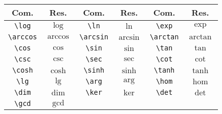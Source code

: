% 
% 
% 
% 
% 
\begin{tabular}{cc|cc|cc}
    \hline
    Com. & Res. & Com. & Res. & Com. & Res. \\ \hline
    \lstinline!\log! & $\log$ & \lstinline!\ln! & $\ln$ & \lstinline!\exp! & $\exp$ \\
    \lstinline!\arccos! & $\arccos$ & \lstinline!\arcsin! & $\arcsin$ & \lstinline!\arctan! & $\arctan$ \\
    \lstinline!\cos! & $\cos$ & \lstinline!\sin! & $\sin$ & \lstinline!\tan! & $\tan$ \\
    \lstinline!\csc! & $\csc$ & \lstinline!\sec! & $\sec$ & \lstinline!\cot! & $\cot$ \\
    \lstinline!\cosh! & $\cosh$ & \lstinline!\sinh! & $\sinh$ & \lstinline!\tanh! & $\tanh$ \\
    \lstinline!\lg! & $\lg$ & \lstinline!\arg! & $\arg$ & \lstinline!\hom! & $\hom$ \\
    \lstinline!\dim! & $\dim$ & \lstinline!\ker! & $\ker$ & \lstinline!\det! & $\det$ \\
    \lstinline!\gcd! & $\gcd$ & & & & \\ \hline
\end{tabular}

